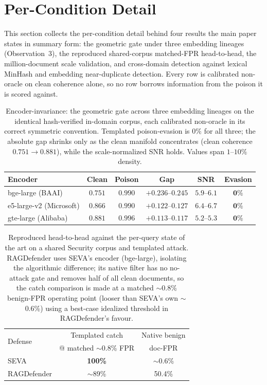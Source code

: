 \documentclass[lettersize,journal]{IEEEtran}
\begin{document}
\section{Per-Condition Detail}
\label{app:detail}
This section collects the per-condition detail behind four results the main paper
states in summary form: the geometric gate under three embedding lineages
(Observation~3), the reproduced shared-corpus matched-FPR head-to-head, the
million-document scale validation, and cross-domain detection against lexical
MinHash and embedding near-duplicate detection. Every row is calibrated non-oracle
on clean coherence alone, so no row borrows information from the poison it is
scored against.

\begin{table}[H]
\centering
\scriptsize
\setlength{\tabcolsep}{3pt}
\caption{Encoder-invariance: the geometric gate across three embedding lineages on the
identical hash-verified in-domain corpus, each calibrated non-oracle in its correct
symmetric convention. Templated poison-evasion is $0\%$ for all three; the absolute gap
shrinks only as the clean manifold concentrates (clean coherence $0.751\!\to\!0.881$),
while the scale-normalized SNR holds. Values span $1$--$10\%$ density.}
\label{tab:encoder}
\begin{tabular}{lccccc}
\toprule
Encoder & Clean & Poison & Gap & SNR & Evasion \\
\midrule
bge-large (BAAI) & $0.751$ & $0.990$ & $+0.236$--$0.245$ & $5.9$--$6.1$ & $\mathbf{0\%}$ \\
e5-large-v2 (Microsoft) & $0.866$ & $0.990$ & $+0.122$--$0.127$ & $6.4$--$6.7$ & $\mathbf{0\%}$ \\
gte-large (Alibaba) & $0.881$ & $0.996$ & $+0.113$--$0.117$ & $5.2$--$5.3$ & $\mathbf{0\%}$ \\
\bottomrule
\end{tabular}
\end{table}

\begin{table}[H]
\centering
\scriptsize
\setlength{\tabcolsep}{3pt}
\caption{Reproduced head-to-head against the per-query state of the art on a
shared Security corpus and templated attack. RAGDefender uses SEVA's encoder
(bge-large), isolating the algorithmic difference; its native filter has no
no-attack gate and removes half of all clean documents, so the catch comparison
is made at a matched $\sim$0.8\% benign-FPR operating point (looser than SEVA's own
$\sim$0.6\%) using a best-case idealized threshold in RAGDefender's favour.}
\label{tab:h2h}
\begin{tabular}{lcc}
\toprule
\multirow{2}{*}{Defense} & Templated catch & Native benign \\
        & @ matched $\sim$0.8\% FPR & doc-FPR \\
\midrule
SEVA & \textbf{100\%} & $\sim$0.6\% \\
RAGDefender & $\sim$89\% & 50.4\% \\
\bottomrule
\end{tabular}
\end{table}
\end{document}
